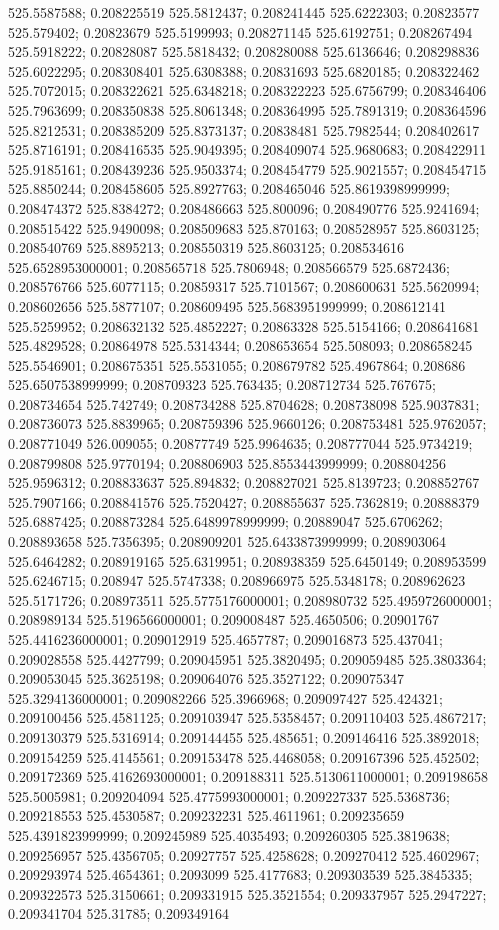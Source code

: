 525.5587588; 0.208225519 525.5812437; 0.208241445 525.6222303; 0.20823577 525.579402; 0.20823679 525.5199993; 0.208271145 525.6192751; 0.208267494 525.5918222; 0.20828087 525.5818432; 0.208280088 525.6136646; 0.208298836 525.6022295; 0.208308401 525.6308388; 0.20831693 525.6820185; 0.208322462 525.7072015; 0.208322621 525.6348218; 0.208322223 525.6756799; 0.208346406 525.7963699; 0.208350838 525.8061348; 0.208364995 525.7891319; 0.208364596 525.8212531; 0.208385209 525.8373137; 0.20838481 525.7982544; 0.208402617 525.8716191; 0.208416535 525.9049395; 0.208409074 525.9680683; 0.208422911 525.9185161; 0.208439236 525.9503374; 0.208454779 525.9021557; 0.208454715 525.8850244; 0.208458605 525.8927763; 0.208465046 525.8619398999999; 0.208474372 525.8384272; 0.208486663 525.800096; 0.208490776 525.9241694; 0.208515422 525.9490098; 0.208509683 525.870163; 0.208528957 525.8603125; 0.208540769 525.8895213; 0.208550319 525.8603125; 0.208534616 525.6528953000001; 0.208565718 525.7806948; 0.208566579 525.6872436; 0.208576766 525.6077115; 0.20859317 525.7101567; 0.208600631 525.5620994; 0.208602656 525.5877107; 0.208609495 525.5683951999999; 0.208612141 525.5259952; 0.208632132 525.4852227; 0.20863328 525.5154166; 0.208641681 525.4829528; 0.20864978 525.5314344; 0.208653654 525.508093; 0.208658245 525.5546901; 0.208675351 525.5531055; 0.208679782 525.4967864; 0.208686 525.6507538999999; 0.208709323 525.763435; 0.208712734 525.767675; 0.208734654 525.742749; 0.208734288 525.8704628; 0.208738098 525.9037831; 0.208736073 525.8839965; 0.208759396 525.9660126; 0.208753481 525.9762057; 0.208771049 526.009055; 0.20877749 525.9964635; 0.208777044 525.9734219; 0.208799808 525.9770194; 0.208806903 525.8553443999999; 0.208804256 525.9596312; 0.208833637 525.894832; 0.208827021 525.8139723; 0.208852767 525.7907166; 0.208841576 525.7520427; 0.208855637 525.7362819; 0.20888379 525.6887425; 0.208873284 525.6489978999999; 0.20889047 525.6706262; 0.208893658 525.7356395; 0.208909201 525.6433873999999; 0.208903064 525.6464282; 0.208919165 525.6319951; 0.208938359 525.6450149; 0.208953599 525.6246715; 0.208947 525.5747338; 0.208966975 525.5348178; 0.208962623 525.5171726; 0.208973511 525.5775176000001; 0.208980732 525.4959726000001; 0.208989134 525.5196566000001; 0.209008487 525.4650506; 0.20901767 525.4416236000001; 0.209012919 525.4657787; 0.209016873 525.437041; 0.209028558 525.4427799; 0.209045951 525.3820495; 0.209059485 525.3803364; 0.209053045 525.3625198; 0.209064076 525.3527122; 0.209075347 525.3294136000001; 0.209082266 525.3966968; 0.209097427 525.424321; 0.209100456 525.4581125; 0.209103947 525.5358457; 0.209110403 525.4867217; 0.209130379 525.5316914; 0.209144455 525.485651; 0.209146416 525.3892018; 0.209154259 525.4145561; 0.209153478 525.4468058; 0.209167396 525.452502; 0.209172369 525.4162693000001; 0.209188311 525.5130611000001; 0.209198658 525.5005981; 0.209204094 525.4775993000001; 0.209227337 525.5368736; 0.209218553 525.4530587; 0.209232231 525.4611961; 0.209235659 525.4391823999999; 0.209245989 525.4035493; 0.209260305 525.3819638; 0.209256957 525.4356705; 0.20927757 525.4258628; 0.209270412 525.4602967; 0.209293974 525.4654361; 0.2093099 525.4177683; 0.209303539 525.3845335; 0.209322573 525.3150661; 0.209331915 525.3521554; 0.209337957 525.2947227; 0.209341704 525.31785; 0.209349164 